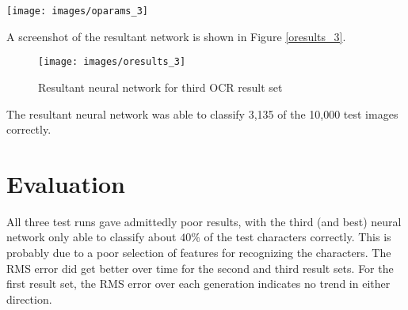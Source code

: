 \begin{center}
\texttt{[image: images/oparams\_3]}
\end{center}

A screenshot of the resultant network is shown in Figure \ref{oresults_3}.

\begin{figure}[hbt!]
  \centering
  \texttt{[image: images/oresults\_3]}
  \caption{Resultant neural network for third OCR result set}
  \label{oresults_2}
\end{figure}

The resultant neural network was able to classify 3,135 of the 10,000
test images correctly.

\section{Evaluation}
All three test runs gave admittedly poor results, with the third (and
best) neural network only able to classify about $40\%$ of the test
characters correctly.
This is probably due to a poor selection of features for recognizing
the characters.
The RMS error did get better over time for the second and third result
sets.
For the first result set, the RMS error over each generation indicates
no trend in either direction.
